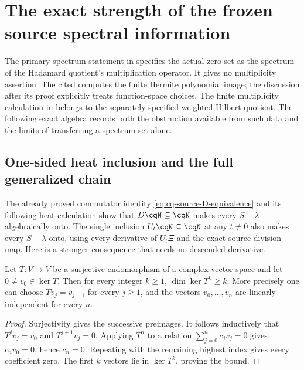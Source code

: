 \section{The exact strength of the frozen source spectral information}
\label{sec:cq-source-spectral-strength}

The primary spectrum statement in \cite[Proposition~3.6(ii)]{cqCCM}
specifies the actual zero set as the spectrum of the Hadamard
quotient's multiplication operator. It gives no multiplicity
assertion. The cited \cite[Proposition~2.24]{cqCM} computes the
finite Hermite polynomial image; the discussion after its proof
explicitly treats function-space choices. The finite multiplicity
calculation in \cite[Theorem~2.47 and equations (2.447)--(2.449)]{cqCM}
belongs to the separately specified weighted Hilbert quotient.
The following exact algebra records both the obstruction available
from such data and the limits of transferring a spectrum set alone.

\subsection{One-sided heat inclusion and the full generalized chain}

The already proved commutator identity
\eqref{eq:cq-source-D-equivalence} and its following heat calculation
show that $D\cqN\subseteq\cqN$ makes every $S-\lambda$ algebraically
onto. The single inclusion $U_t\cqN\subseteq\cqN$ at any $t\ne0$
also makes every $S-\lambda$ onto, using every derivative
of $U_t\Xi$ and the exact source division map.
Here is a stronger consequence that needs no descended derivative.

\begin{cqlemma}
Let $T:V\to V$ be a surjective endomorphism of a complex vector
space and let $0\ne v_0\in\ker T$. Then for every integer $k\geq1$,
$\dim\ker T^k\geq k$. More precisely one can choose
$Tv_j=v_{j-1}$ for every $j\geq1$, and the vectors
$v_0,\ldots,v_n$ are linearly independent for every $n$.
\end{cqlemma}
\begin{proof}
Surjectivity gives the successive preimages. It follows inductively
that $T^jv_j=v_0$ and $T^{j+1}v_j=0$. Applying $T^n$ to a relation
$\sum_{j=0}^n c_jv_j=0$ gives $c_nv_0=0$, hence $c_n=0$.
Repeating with the remaining highest index gives every coefficient
zero. The first $k$ vectors lie in $\ker T^k$, proving the bound.
\end{proof}

